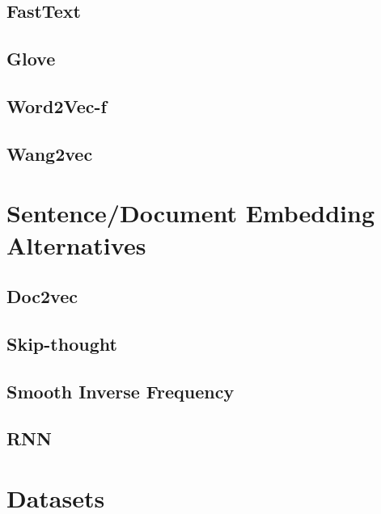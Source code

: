 \subsection{FastText}
\subsection{Glove}
\subsection{Word2Vec-f}
\subsection{Wang2vec}


\section{Sentence/Document Embedding Alternatives}
\subsection{Doc2vec}
\subsection{Skip-thought}
\subsection{Smooth Inverse Frequency}
\subsection{RNN}


\section{Datasets}